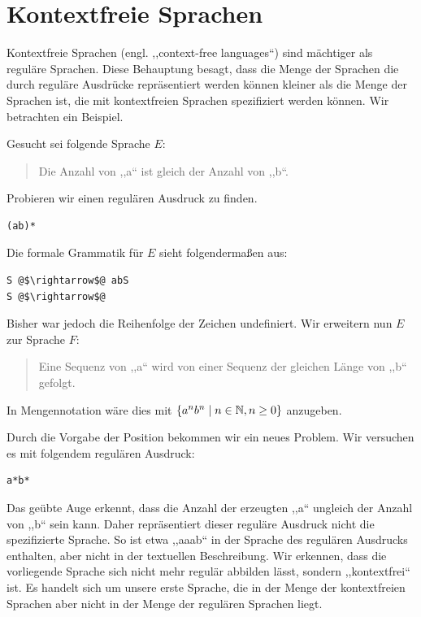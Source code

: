 \section{Kontextfreie Sprachen}
%
Kontextfreie Sprachen (engl. ,,context-free languages``) sind mächtiger als reguläre Sprachen. Diese Behauptung besagt, dass die Menge der Sprachen die durch reguläre Ausdrücke repräsentiert werden können kleiner als die Menge der Sprachen ist, die mit kontextfreien Sprachen spezifiziert werden können. Wir betrachten ein Beispiel.

Gesucht sei folgende Sprache $E$:
\begin{quote}
  Die Anzahl von ,,a`` ist gleich der Anzahl von ,,b``. 
\end{quote}

Probieren wir einen regulären Ausdruck zu finden.
\begin{lstlisting}
(ab)*
\end{lstlisting}

Die formale Grammatik für $E$ sieht folgendermaßen aus:
\begin{lstlisting}
S @$\rightarrow$@ abS
S @$\rightarrow$@
\end{lstlisting}

Bisher war jedoch die Reihenfolge der Zeichen undefiniert. Wir erweitern nun $E$ zur Sprache $F$:
\begin{quote}
  Eine Sequenz von ,,a`` wird von einer Sequenz der gleichen Länge von ,,b`` gefolgt.
\end{quote}
In Mengennotation wäre dies mit $\left\{a^n b^n \mid n \in \mathbb{N}, n \geq 0\right\}$ anzugeben.

Durch die Vorgabe der Position bekommen wir ein neues Problem. Wir versuchen es mit folgendem regulären Ausdruck:
\begin{lstlisting}
a*b*
\end{lstlisting}

Das geübte Auge erkennt, dass die Anzahl der erzeugten ,,a`` ungleich der Anzahl von ,,b`` sein kann. Daher repräsentiert dieser reguläre Ausdruck nicht die spezifizierte Sprache. So ist etwa ,,aaab`` in der Sprache des regulären Ausdrucks enthalten, aber nicht in der textuellen Beschreibung. Wir erkennen, dass die vorliegende Sprache sich nicht mehr regulär abbilden lässt, sondern ,,kontextfrei`` ist. Es handelt sich um unsere erste Sprache, die in der Menge der kontextfreien Sprachen aber nicht in der Menge der regulären Sprachen liegt.

